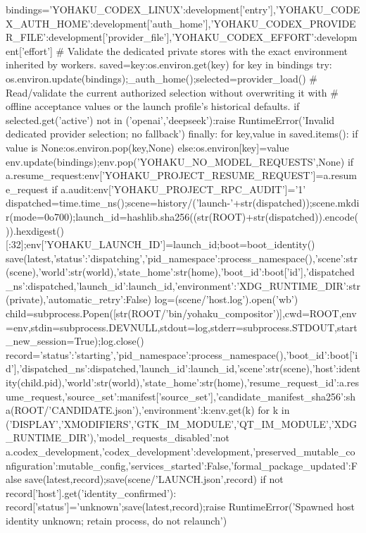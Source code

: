   bindings={'YOHAKU_CODEX_LINUX':development['entry'],'YOHAKU_CODEX_AUTH_HOME':development['auth_home'],'YOHAKU_CODEX_PROVIDER_FILE':development['provider_file'],'YOHAKU_CODEX_EFFORT':development['effort']}
  # Validate the dedicated private stores with the exact environment inherited by workers.
  saved={key:os.environ.get(key) for key in bindings}
  try:
   os.environ.update(bindings);_auth_home();selected=provider_load()
   # Read/validate the current authorized selection without overwriting it with
   # offline acceptance values or the launch profile's historical defaults.
   if selected.get('active') not in ('openai','deepseek'):raise RuntimeError('Invalid dedicated provider selection; no fallback')
  finally:
   for key,value in saved.items():
    if value is None:os.environ.pop(key,None)
    else:os.environ[key]=value
  env.update(bindings);env.pop('YOHAKU_NO_MODEL_REQUESTS',None)
 if a.resume_request:env['YOHAKU_PROJECT_RESUME_REQUEST']=a.resume_request
 if a.audit:env['YOHAKU_PROJECT_RPC_AUDIT']='1'
 dispatched=time.time_ns();scene=history/('launch-'+str(dispatched));scene.mkdir(mode=0o700);launch_id=hashlib.sha256((str(ROOT)+str(dispatched)).encode()).hexdigest()[:32];env['YOHAKU_LAUNCH_ID']=launch_id;boot=boot_identity()
 save(latest,{'status':'dispatching','pid_namespace':process_namespace(),'scene':str(scene),'world':str(world),'state_home':str(home),'boot_id':boot['id'],'dispatched_ns':dispatched,'launch_id':launch_id,'environment':{'XDG_RUNTIME_DIR':str(private)},'automatic_retry':False})
 log=(scene/'host.log').open('wb')
 child=subprocess.Popen([str(ROOT/'bin/yohaku_compositor')],cwd=ROOT,env=env,stdin=subprocess.DEVNULL,stdout=log,stderr=subprocess.STDOUT,start_new_session=True);log.close()
 record={'status':'starting','pid_namespace':process_namespace(),'boot_id':boot['id'],'dispatched_ns':dispatched,'launch_id':launch_id,'scene':str(scene),'host':identity(child.pid),'world':str(world),'state_home':str(home),'resume_request_id':a.resume_request,'source_set':manifest['source_set'],'candidate_manifest_sha256':sha(ROOT/'CANDIDATE.json'),'environment':{k:env.get(k) for k in ('DISPLAY','XMODIFIERS','GTK_IM_MODULE','QT_IM_MODULE','XDG_RUNTIME_DIR')},'model_requests_disabled':not a.codex_development,'codex_development':development,'preserved_mutable_configuration':mutable_config,'services_started':False,'formal_package_updated':False}
 save(latest,record);save(scene/'LAUNCH.json',record)
 if not record['host'].get('identity_confirmed'):
  record['status']='unknown';save(latest,record);raise RuntimeError('Spawned host identity unknown; retain process, do not relaunch')
